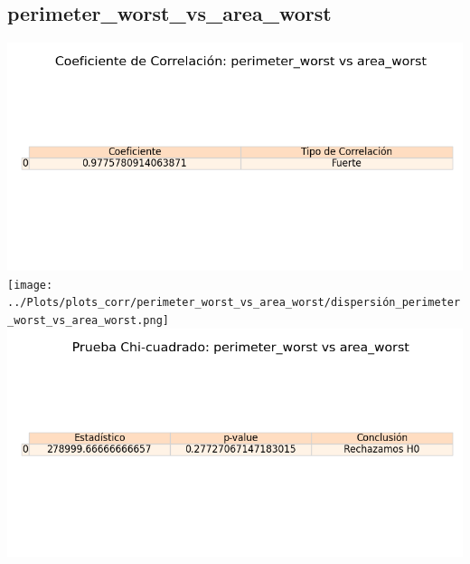 \documentclass[a4paper, 12pt]{article}
\begin{document}
\subsection{perimeter\_worst\_vs\_area\_worst}
    \includegraphics[width = \textwidth]{../Plots/plots_corr/perimeter_worst_vs_area_worst/coeficiente_correlacion_perimeter_worst_vs_area_worst.png}
    \texttt{[image: ../Plots/plots\_corr/perimeter\_worst\_vs\_area\_worst/dispersión\_perimeter\_worst\_vs\_area\_worst.png]}
    \includegraphics[width = \textwidth]{../Plots/plots_corr/perimeter_worst_vs_area_worst/chi_cuadrado_perimeter_worst_vs_area_worst.png}
\end{document}
